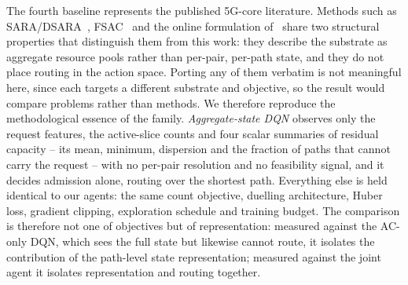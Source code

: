 \documentclass[10pt,journal,comsoc]{IEEEtran}
\begin{document}
The fourth baseline represents the published 5G-core literature.
Methods such as SARA/DSARA~\cite{villota2022admission},
FSAC~\cite{wang2024fsac} and the online formulation
of~\cite{sulaiman2025datadriven} share two structural properties that
distinguish them from this work: they describe the substrate as aggregate
resource pools rather than per-pair, per-path state, and they do not place
routing in the action space. Porting any of them verbatim is not
meaningful here, since each targets a different substrate and objective,
so the result would compare problems rather than methods. We therefore
reproduce the methodological essence of the family. \emph{Aggregate-state
DQN} observes only the request features, the active-slice counts and four
scalar summaries of residual capacity -- its mean, minimum, dispersion and
the fraction of paths that cannot carry the request -- with no per-pair
resolution and no feasibility signal, and it decides admission alone,
routing over the shortest path. Everything else is held identical to our
agents: the same count objective, duelling architecture, Huber loss,
gradient clipping, exploration schedule and training budget. The
comparison is therefore not one of objectives but of representation:
measured against the AC-only DQN, which sees the full state but likewise
cannot route, it isolates the contribution of the path-level state
representation; measured against the joint agent it isolates
representation and routing together.
\end{document}
